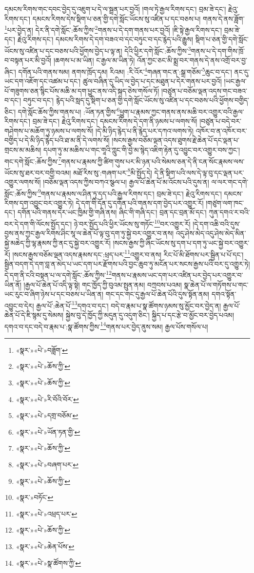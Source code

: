 དམངས་རིགས་གང་དབང་བྱེད་དུ་འཇུག་པ་དེ་ལ་སྦྲན་པར་བྱའོ། །གལ་ཏེ་རྒྱལ་རིགས་དང་། བྲམ་ཟེ་དང་། རྗེའུ་རིགས་དང་། དམངས་རིགས་དེས་སྡིག་པ་ཅན་གྱི་དགེ་སློང་ཡོངས་སུ་འཛིན་པ་དང་བཅས་པ། གནས་དེ་ནས་ཟློག་\footnote{«སྣར་»«པེ་»བཟློག་}པར་བྱེད་ན། དེར་ནི་དགེ་སློང་:ཆོས་ཀྱིས་\footnote{«སྣར་»«པེ་»ཆོས་ཀྱི་}གནས་པ་དེ་དག་གནས་པར་བྱའོ། །ཇི་སྟེ་རྒྱལ་རིགས་དང་། བྲམ་ཟེ་དང་། རྗེའུ་རིགས་དང་། དམངས་རིགས་དེ་དག་བཟའ་བ་དང་བཏུང་བ་དང་རྙེད་པའི་རྒྱུས། སྡིག་པ་ཅན་གྱི་དགེ་སློང་ཡོངས་སུ་འཛིན་པ་དང་བཅས་པའི་ཕྱོགས་བྱེད་པ་ལྟ་ན། དེའི་ཕྱིར་དགེ་སློང་:ཆོས་ཀྱིས་\footnote{«སྣར་»«པེ་»ཆོས་ཀྱི་}གནས་པ་དེ་དག་གིས་ཁྲོ་བ་བསྟན་པར་མི་བྱའོ། །ཆགས་པ་མ་ཡིན། ང་རྒྱལ་མ་ཡིན་ཏེ། འོན་ཀྱང་ཅང་མི་སྨྲ་བར་གནས་དེ་ནས་འགྲོ་བར་བྱ་ཞིང་། དགོན་པའི་གནས་སམ། ནགས་ཁྲོད་དམ། རིའམ། :རི་འོར་\footnote{«སྣར་»«པེ་»རི་བོའི་བོར་}གཞན་གང་ན་:སྒྲ་གཅོམ་\footnote{«སྣར་»«པེ་»དགྲ་བཅོམ་}ཆུང་བ་དང་། ནང་དུ་ཡང་དག་འཇོག་དང་འཚམ་པ་དང་། ཚུལ་བཞིན་དུ་ཡིད་ལ་བྱེད་པ་དང་མཐུན་པ་དེར་གནས་པར་བྱའོ། །ཡང་རྒྱལ་པོ་གཟུགས་ཅན་སྙིང་པོས་མཆི་མ་དག་ཕྱུང་ནས་འདི་སྐད་ཅེས་གསོལ་ཏོ། །བཙུན་པ་བཅོམ་ལྡན་འདས་གང་བཟའ་བ་དང་། བཏུང་བ་དང་། རྙེད་པའི་སླད་དུ་སྡིག་པ་ཅན་གྱི་དགེ་སློང་ཡོངས་སུ་འཛིན་པ་དང་བཅས་པའི་ཕྱོགས་བགྱིད་ཅིང་། དགེ་སློང་ཆོས་ཀྱིས་གནས་པ། :ཡོན་ཏན་གྱིས་\footnote{«སྣར་»«པེ་»ཡོན་ཏན་གྱི་}ཕྱུག་པ་རྣམས་ཀྱང་གནས་ནས་མཆི་བར་འགྱུར་བའི་རྒྱལ་རིགས་དང་། བྲམ་ཟེ་དང་། རྗེའུ་རིགས་དང་། དམངས་རིགས་དེ་དག་ནི་ཉམས་པ་ལགས་སོ། །བཙུན་པ་བདེ་བར་གཤེགས་པ་མཆོག་ཏུ་ཉམས་པ་ལགས་སོ། །དེ་མི་ཉིད་རྙེད་པ་ནི་རྙེད་པར་དཀའ་ལགས་ཏེ། འཁོར་བ་ན་འཁོར་བར་བགྱིད་པ་དེ་མི་ཉིད་རྙེད་པའི་ཐ་མ་ནི་དེ་ལགས་སོ། །སངས་རྒྱས་བཅོམ་ལྡན་འདས་ཐུགས་རྗེ་ཆེན་པོ་དང་ལྡན་པ་གྲངས་མ་མཆིས། དཔག་ཏུ་མ་མཆིས་པ་གང་གཱའི་ཀླུང་གི་བྱེ་མ་སྙེད་འཇིག་རྟེན་དུ་འབྱུང་བར་འགྱུར་བས་ཀྱང་། གང་དགེ་སློང་:ཆོས་ཀྱིས་\footnote{«སྣར་»«པེ་»ཆོས་ཀྱི་}གནས་པ་རྣམས་ཀྱི་ཚིག་གུས་པར་མི་ཉན་པའི་སེམས་ཅན་དེ་ནི་ངན་སོང་རྣམས་ལས་ཡོངས་སུ་ཐར་བར་བགྱི་བའམ། མཐོ་རིས་སུ་:གཞག་པར་\footnote{«སྣར་»«པེ་»བཞག་པར་}མི་སྤྱོད་དེ། དེ་ནི་སྡིག་པའི་ལས་དེ་ལྟ་བུ་དང་ལྡན་པར་འགྱུར་ལགས་སོ། །བཅོམ་ལྡན་འདས་ཀྱིས་བཀའ་སྩལ་པ། རྒྱལ་པོ་ཆེན་པོ་མ་འོངས་པའི་དུས་ན། ལ་ལར་གང་དགེ་སློང་:ཆོས་ཀྱིས་\footnote{«སྣར་»«པེ་»ཆོས་ཀྱི་}གནས་པ་རྣམས་ལ་ཤིན་ཏུ་དད་པའི་རྒྱལ་རིགས་དང་། བྲམ་ཟེ་དང་། རྗེའུ་རིགས་དང་། དམངས་རིགས་དག་འབྱུང་བར་འགྱུར་ཏེ། དེ་དག་གི་དོན་དུ་དགོན་པའི་གནས་དག་བྱེད་པར་འགྱུར་རོ། །གཙུག་ལག་ཁང་དང་། དགོན་པའི་གནས་དེར་ཡང་ཁྱིམ་གྱི་གཞི་ནས། ཞིང་གི་གཞི་དང་། བྲན་དང་བྲན་མོ་དང་། ཀུན་དགའ་ར་བའི་བར་དེ་དག་གི་ལོངས་སྤྱོད་དང་། ཉེ་བར་སྤྱོད་པའི་ཕྱིར་ཡོངས་སུ་གཏོང་\footnote{«སྣར་»བཏོང་}བར་འགྱུར་རོ། །དེ་དག་འཆི་བའི་དུས་བྱས་ནས་ཀྱང་རྒྱལ་རིགས་ཤིང་སཱ་ལ་ཆེན་པོ་ལྟ་བུ་དག་ཏུ་སྐྱེ་བར་འགྱུར་བ་ནས། འདུ་ཤེས་མེད་འདུ་ཤེས་མེད་མིན་སྐྱེ་མཆེད་ཀྱི་ལྷ་རྣམས་ཀྱི་ནང་དུ་སྐྱེ་བར་འགྱུར་རོ། །སངས་རྒྱས་ཀྱི་ཞིང་ཡོངས་སུ་དག་པ་དག་ཏུ་ཡང་སྐྱེ་བར་འགྱུར་རོ། །སངས་རྒྱས་བཅོམ་ལྡན་འདས་རྣམས་དང་:ཕྲད་པར་\footnote{«སྣར་»«པེ་»འཕྲད་པར་}འགྱུར་བ་ནས། རིང་པོ་མི་ཐོགས་པར་སྦྱིན་པ་པོ་དང་། སྦྱིན་བདག་དེ་དག་བླ་ན་མེད་པ་ཡང་དག་པར་རྫོགས་པའི་བྱང་ཆུབ་ཏུ་མངོན་པར་སངས་རྒྱས་པའི་བར་དུ་འགྱུར་ཏེ། དེ་དག་ནི་ངའི་བསྟན་པ་ལ་དགེ་སློང་:ཆོས་ཀྱིས་\footnote{«སྣར་»«པེ་»ཆོས་ཀྱི་}གནས་པ་རྣམས་ཡང་དག་པར་འཛིན་པར་བྱེད་པར་འགྱུར་བ་ཡིན་ནོ། །རྒྱལ་པོ་ཆེན་པོ་འདི་ལྟ་སྟེ། གང་ཁྱོད་ཀྱི་བུའམ་སྤུན་ནམ། བཀྲབས་པའམ། སྣ་ཆེན་པོ་ལ་གཏོགས་པ་གང་ཡང་རུང་བ་ཞིག་ཉེས་པ་དང་བཅས་པ་ཡིན་ན། གང་དང་གང་དུ་རྒྱལ་པོ་ཆེན་པོའི་དུས་སྟོན་ནམ། དགའ་སྟོན་འབྱུང་བ་དེར། རྒྱལ་པོ་:ཆེན་པོ་\footnote{«སྣར་»«པེ་»ཆེན་པོས་}དགའ་བ་དང་། བདེ་བ་རྣམ་པ་སྣ་ཚོགས་ཉམས་སུ་མྱོང་བར་བྱེད་ན། རྒྱལ་པོ་ཆེན་པོ་དེ་ཇི་སྙམ་དུ་སེམས། སྐྱེས་བུ་དེ་ཁྱོད་ཀྱི་མདུན་དུ་འདུག་ཅིང་། སྐྱིད་པ་དང་རྩེ་བ་མྱོང་བར་བྱེད་པའམ། དགའ་བ་དང་བདེ་བ་རྣམ་པ་:སྣ་ཚོགས་ཀྱིས་\footnote{«སྣར་»«པེ་»སྣ་ཚོགས་ཀྱི་}གནས་པར་བྱེད་ནུས་སམ། རྒྱལ་པོས་གསོལ་པ། 